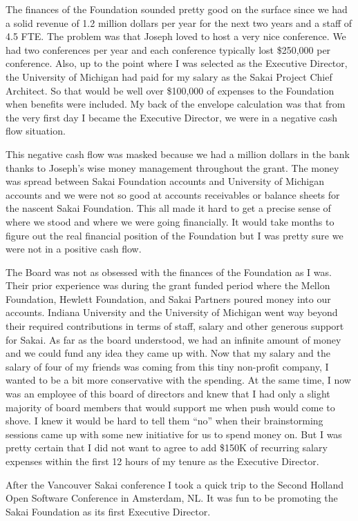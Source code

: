 \documentclass[12pt]{book}
\begin{document}
The finances of the Foundation sounded pretty good on the surface since we had a
solid revenue of 1.2 million dollars per year for the next two years and a staff
of 4.5 FTE.  The problem was that Joseph loved to host a very nice conference.  We had two
conferences per year and each conference typically lost \$250,000 per conference.
Also, up to the point where I was selected as the Executive Director, the University
of Michigan had paid for my salary as the Sakai Project Chief Architect.
So that would be well over \$100,000 of expenses to the Foundation when benefits
were included.   My back of the envelope calculation was that from the very
first day I became the Executive Director, we were in a negative cash flow situation.

This negative cash flow was masked because we had a million dollars in the bank
thanks to Joseph's wise money management throughout the grant.  The money was
spread between Sakai Foundation accounts and University of Michigan accounts
and we were not so good at accounts receivables or balance sheets for the nascent
Sakai Foundation.  This all made it hard to get a precise sense of where we stood and
where we were going financially.   It would take months to figure out the
real financial position of the Foundation but I was pretty sure we were not
in a positive cash flow.

The Board was not as obsessed with the finances of the Foundation as I was.
Their prior experience was during the
grant funded period where the Mellon Foundation, Hewlett Foundation, and Sakai
Partners poured money into our accounts.  Indiana University
and the University of Michigan went way beyond their required contributions in terms
of staff, salary and other generous support for Sakai.   As far as the board
understood, we had an infinite amount of money and we could fund any idea they
came up with.  Now that my salary and the salary of four of my friends was
coming from this tiny non-profit company, I wanted to be a bit more conservative
with the spending.  At the same time, I now was an employee of this board
of directors and knew that I had only a slight majority of board members that
would support me when push would come to shove.  I knew it would be hard to tell them
``no'' when their brainstorming sessions came up with some new initiative for us
to spend money on.  But I was pretty certain that I did not want to
agree to add \$150K of recurring salary expenses within the first 12 hours of
my tenure as the Executive Director.

After the Vancouver Sakai conference I took a quick trip to
the Second Holland Open Software Conference in Amsterdam, NL.  It was 
fun to be promoting the Sakai Foundation as its first Executive Director.
\end{document}
